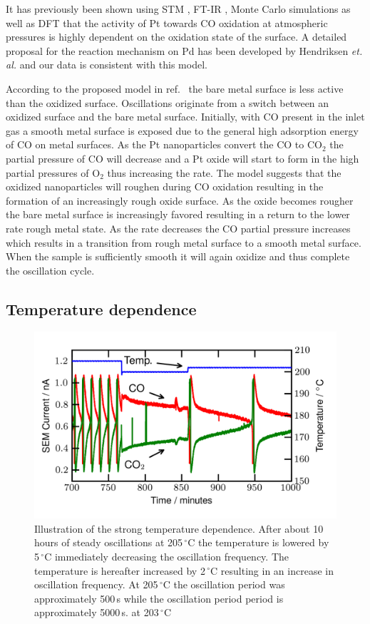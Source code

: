 \documentclass[journal=jacsat,manuscript=article]{achemso}
\begin{document}
It has previously been shown using STM \cite{Hendriksen2002}, FT-IR
\cite{Carlsson2006}, Monte Carlo simulations \cite{Zhdanov2002} as well as DFT
\cite{Gong2004} that the activity of Pt towards CO oxidation at atmospheric
pressures is highly dependent on the oxidation state of the surface. A detailed
proposal for the reaction mechanism on Pd has been developed by Hendriksen
\textit{et. al.}\cite{Hendriksen2010} and our data is consistent with this
model.

According to the proposed model in ref.~ the bare metal
surface is less active than the oxidized surface. Oscillations originate from a
switch between an oxidized surface and the bare metal surface. Initially, with
CO present in the inlet gas a smooth metal surface is exposed due to the
general high adsorption energy of CO on metal surfaces. As the Pt nanoparticles
convert the CO to CO$_2$ the partial pressure of CO will decrease and a Pt
oxide will start to form in the high partial pressures of O$_2$ thus increasing
the rate. The model\cite{Hendriksen2010} suggests that the oxidized
nanoparticles will roughen during CO oxidation resulting in the formation of an
increasingly rough oxide surface. As the oxide becomes rougher the bare metal
surface is increasingly favored resulting in a return to the lower rate rough
metal state. As the rate decreases the CO partial pressure increases which
results in a transition from rough metal surface to a smooth metal surface.
When the sample is sufficiently smooth it will again oxidize and thus complete
the oscillation cycle.

\subsection{Temperature dependence}
\begin{figure}
\includegraphics[width=12cm]{temperature_dependence.png}
\caption{Illustration of the strong temperature dependence. After about 10
  hours of steady oscillations at 205\,$^\circ$C the temperature is lowered by
  5\,$^\circ$C immediately decreasing the oscillation frequency. The temperature
  is hereafter increased by 2\,$^\circ$C resulting in an increase in oscillation
  frequency. At 205\,$^\circ$C the oscillation period was approximately 500\,s
  while the oscillation period period is approximately 5000\,s. at
  203\,$^\circ$C
  \label{fgr:temperature_dependence}
}
\end{figure}
\end{document}
